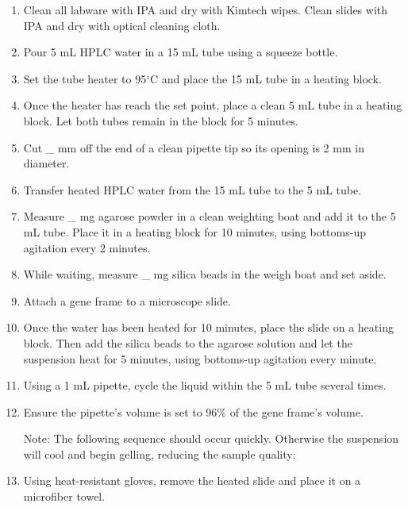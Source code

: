\begin{enumerate}
    \item Clean all labware with IPA and dry with Kimtech wipes. Clean slides with IPA and dry with optical cleaning cloth.
    
    \item Pour 5 mL HPLC water in a 15 mL tube using a squeeze bottle.

    \item Set the tube heater to 95$^\circ$C and place the 15 mL tube in a heating block.

    \item Once the heater has reach the set point, place a clean 5 mL tube in a heating block. Let both tubes remain in the block for 5 minutes.

    \item Cut \_ mm off the end of a clean pipette tip so its opening is 2 mm in diameter.

    \item Transfer heated HPLC water from the 15 mL tube to the 5 mL tube.

    \item Measure \_ mg agarose powder in a clean weighting boat and add it to the 5 mL tube. Place it in a heating block for 10 minutes, using bottoms-up agitation every 2 minutes.

    \item While waiting, measure \_ mg silica beads in the weigh boat and set aside.

    \item Attach a gene frame to a microscope slide.

    \item Once the water has been heated for 10 minutes, place the slide on a heating block. Then add the silica beads to the agarose solution and let the suspension heat for 5 minutes, using bottoms-up agitation every minute.

    \item Using a 1 mL pipette, cycle the liquid within the 5 mL tube several times.

    \item Ensure the pipette's volume is set to 96\% of the gene frame's volume.

    Note: The following sequence should occur quickly. Otherwise the suspension will cool and begin gelling, reducing the sample quality:

    \item Using heat-resistant gloves, remove the heated slide and place it on a microfiber towel.


\end{enumerate}
